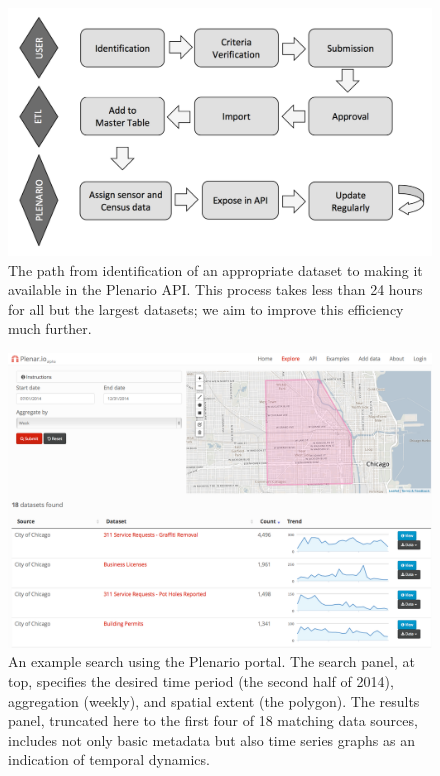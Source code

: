 \documentclass[11pt]{article}
\begin{document}
\begin{figure}
	\centering
	\label{fig:flowchart}
	\caption{The path from identification of an appropriate dataset to making it available in the Plenario API. This process takes less than 24 hours for all but the largest datasets; we aim to improve this efficiency much further.}
	\includegraphics[scale=.45]{flowchart.pdf}
\end{figure}

\begin{figure}
	\centering
	\label{fig:plenario-search-example}
	\caption{An example search using the Plenario portal. The search panel, at top, specifies the desired time period (the second half of 2014), aggregation (weekly), and spatial extent (the polygon). The results panel, truncated here to the first four of 18 matching data sources, includes not only basic metadata but also time series graphs as an indication of temporal dynamics.\vspace{.4cm}}
	\includegraphics[scale=.25]{plenario_search_example.png}
\end{figure}
\end{document}
